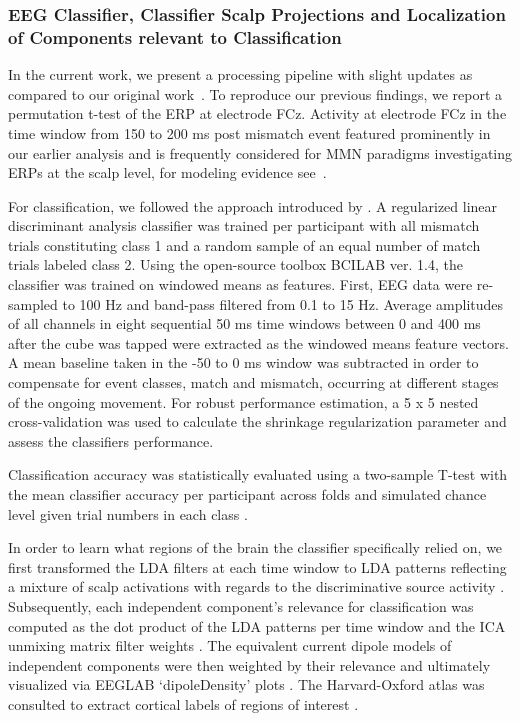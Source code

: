 \subsubsection{EEG Classifier, Classifier Scalp Projections and Localization of Components relevant to Classification}

In the current work, we present a processing pipeline with slight updates as compared to our original work~\cite{Gehrke2019-og}. To reproduce our previous findings, we report a permutation t-test of the ERP at electrode FCz. Activity at electrode FCz in the time window from 150 to 200 ms post mismatch event featured prominently in our earlier analysis and is frequently considered for MMN paradigms investigating ERPs at the scalp level, for modeling evidence see~\cite{Lieder2013-dl, Lieder2013-os}.

For classification, we followed the approach introduced by \cite{Zander2016-ed}. A regularized linear discriminant analysis classifier was trained per participant with all mismatch trials constituting class 1 and a random sample of an equal number of match trials labeled class 2. Using the open-source toolbox BCILAB ver. 1.4, the classifier was trained on windowed means as features. First, EEG data were re-sampled to 100 Hz and band-pass filtered from 0.1 to 15 Hz. Average amplitudes of all channels in eight sequential 50 ms time windows between 0 and 400 ms after the cube was tapped were extracted as the windowed means feature vectors. A mean baseline taken in the -50 to 0 ms window was subtracted in order to compensate for event classes, match and mismatch, occurring at different stages of the ongoing movement. For robust performance estimation, a 5 x 5 nested cross-validation was used to calculate the shrinkage regularization parameter and assess the classifiers performance.

Classification accuracy was statistically evaluated using a two-sample T-test with the mean classifier accuracy per participant across folds and simulated chance level given trial numbers in each class \cite{Muller-Putz2007-oc}.

In order to learn what regions of the brain the classifier specifically relied on, we first transformed the LDA filters at each time window to LDA patterns reflecting a mixture of scalp activations with regards to the discriminative source activity \cite{Haufe2014-do}. Subsequently, each independent component's relevance for classification was computed as the dot product of the LDA patterns per time window and the ICA unmixing matrix filter weights \cite{Zander2016-ed}. The equivalent current dipole models of independent components were then weighted by their relevance and ultimately visualized via EEGLAB `dipoleDensity' plots \cite{Krol2018-cw}. The Harvard-Oxford atlas was consulted to extract cortical labels of regions of interest \cite{Makris2006-kp}.

